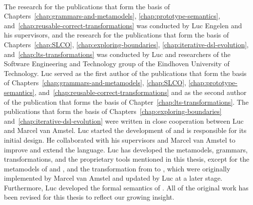 \paragraph{}
The research for the publications that form the basis of Chapters~\ref{chap:grammars-and-metamodels}, \ref{chap:prototype-semantics}, and~\ref{chap:reusable-correct-transformations} was conducted by Luc Engelen and his supervisors,
and the research for the publications that form the basis of Chapters~\ref{chap:SLCO}, \ref{chap:exploring-boundaries}, \ref{chap:iterative-dsl-evolution}, and~\ref{chap:lts-transformations} was conducted by Luc and researchers of the Software Engineering and Technology group of the Eindhoven University of Technology.
Luc served as the first author of the publications that form the basis of Chapters~\ref{chap:grammars-and-metamodels}, \ref{chap:SLCO}, \ref{chap:prototype-semantics}, and~\ref{chap:reusable-correct-transformations} and as the second author of the publication that forms the basis of Chapter~\ref{chap:lts-transformations}.
The publications that form the basis of Chapters~\ref{chap:exploring-boundaries} and~\ref{chap:iterative-dsl-evolution} were written in close cooperation between Luc and Marcel van Amstel.
Luc started the development of \SLCO and is responsible for its initial design.
He collaborated with his supervisors and Marcel van Amstel to improve and extend the language.
Luc has developed the metamodels, grammars, transformations, and the proprietary tools mentioned in this thesis, except for the metamodels of \NQC and \Promela, and the transformation from \SLCO to \Promela, which were originally implemented by Marcel van Amstel and updated by Luc at a later stage.
Furthermore, Luc developed the formal semantics of \SLCO.
All of the original work has been revised for this thesis to reflect our growing insight. 